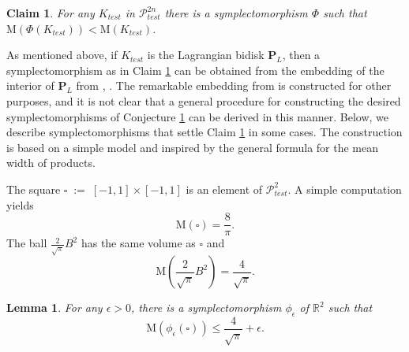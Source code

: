 \documentclass[12pt]{amsart}
\newtheorem{lemma}[theorem]{Lemma}
\newtheorem{claim}[theorem]{Claim}
\theoremstyle{definition}
\newcommand{\eqdef}{\;{:=}\;}
\newcommand{\RR}{{\mathbb R}}
\newcommand{\mw}{{{\mathrm {M}}}}
\begin{document}
\begin{claim}\label{test}
    For any $K_{test}$ in $\mathcal{P}^{2n}_{test}$ there is a symplectomorphism $\Phi$ such that  $\mw(\Phi(K_{test})) < \mw(K_{test})$.
\end{claim}


 As mentioned above, if $K_{test}$ is the Lagrangian bidisk $\mathbf{P}_L$, then a symplectomorphism as in Claim \ref{test} can be obtained from the embedding of the interior of $\mathbf{P}_L$ from \cite{vr}, \cite{ak}. The remarkable embedding from \cite{vr} is constructed for other purposes, and it is not clear that a general procedure for constructing the desired symplectomorphisms of Conjecture \ref{test} can be derived in this manner. Below, we describe symplectomorphisms that settle Claim \ref{test} in some cases. The construction is based on a simple model and inspired by the general formula for the mean width of products.

\medskip

 The square $\square \eqdef [-1,1] \times [-1,1]$ is an element of $\mathcal{P}^{2}_{test}$. A simple computation yields
$$
  \mw(\square) =\frac{8}{\pi}.
$$
The ball $\frac{2}{\sqrt{\pi}} B^2$ has the same volume as $\square$ and $$\mw \left( \frac{2}{\sqrt{\pi}} B^2\right)=\frac{4}{\sqrt{\pi}}.$$


\begin{lemma}\label{roll} For any $\epsilon>0$, there is  a symplectomorphism $\phi_{\epsilon}$ of $\RR^2$ such that  $$\mw(\phi_{\epsilon}(\square)) \leq  \frac{4}{\sqrt\pi} +\epsilon.$$\end{lemma}
\end{document}
